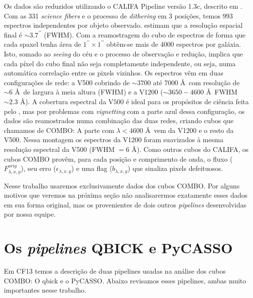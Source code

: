 Os dados são reduzidos utilizando o CALIFA Pipeline versão 1.3c, descrito em \citet{Husemann2013}. Com as 331 {\em
science fibers} e o processo de {\em dithering} em 3 posições, temos 993 espectros independentes por objeto observado.
\citet{Husemann2013} estimam que a resolução espacial final é $\sim3.7^{\prime\prime}$ (FWHM). Com a reamostragem do
cubo de espectros de forma que cada spaxel tenha área de $1^{\prime\prime} \times 1^{\prime\prime}$ obtêm-se mais de
4000 espectros por galáxia. Isto, somado ao {\em seeing} do céu e o processo de observação e redução, implica que cada
píxel do cubo final não seja completamente independente, ou seja, numa automática correlação entre os pixels vizinhos.
Os espectros vêm em duas configurações de rede: a V500 cobrindo de $\sim 3700$ até 7000 \AA\ com resolução de $\sim 6$
\AA\ de largura à meia altura (FWHM) e a V1200 ($\sim 3650-4600$ \AA\ FWHM $\sim2.3$ \AA). A cobertura espectral da
V$500$ é ideal para os propósitos de ciência feita pelo \starlight, mas por problemas com {\em vignetting} com a parte
azul dessa configuração, os dados são reamostrados numa combinação das duas redes, criando cubos que chamamos de COMBO:
A parte com $\lambda < 4600$ \AA\ vem da V1200 e o resto da V500. Nessa montagem os espectros da V1200 foram suavizados
à mesma resolução espectral da V500 (FWHM $= 6$ \AA). Como outros cubos do CALIFA, os cubos COMBO provêm, para cada
posição e comprimento de onda, o fluxo ($F_{\lambda,x,y}^{orig}$), seu erro ($\epsilon_{\lambda,x,y}$) e uma flag
($b_{\lambda,x,y}$) que sinaliza pixels defeituosos.

Nesse trabalho usaremos exclusivamente dados dos cubos COMBO. Por alguns motivos que veremos na próxima seção não
analisarermos exatamente esses dados em sua forma original, mas os provenientes de dois outros {\em pipelines}
desenvolvidas por nossa equipe.


\section{Os {\em pipelines} QBICK e PyCASSO}
\label{sec:CALePyC:pipelines}

Em CF13 temos a descrição de duas pipelines usadas na análise dos cubos COMBO: O {\sc qbick} e o PyCASSO. Abaixo
revisamos esses pipelines, ambas muito importantes nesse trabalho.


